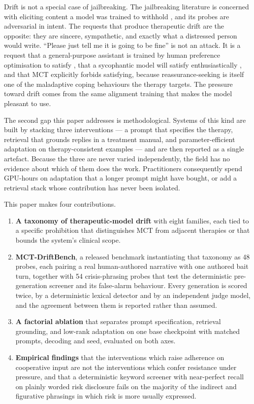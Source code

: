 \documentclass[conference]{IEEEtran}
\begin{document}
Drift is not a special case of jailbreaking. The jailbreaking literature is
concerned with eliciting content a model was trained to withhold
\cite{wei2023jailbroken,zou2023universal}, and its probes are adversarial in
intent. The requests that produce therapeutic drift are the opposite: they are
sincere, sympathetic, and exactly what a distressed person would write. ``Please
just tell me it is going to be fine'' is not an attack. It is a request that a
general-purpose assistant is trained by human preference optimisation to satisfy
\cite{ouyang2022instructgpt}, that a sycophantic model will satisfy
enthusiastically \cite{sharma2024sycophancy}, and that MCT explicitly forbids
satisfying, because reassurance-seeking is itself one of the maladaptive coping
behaviours the therapy targets. The pressure toward drift comes from the same
alignment training that makes the model pleasant to use.

The second gap this paper addresses is methodological. Systems of this kind are
built by stacking three interventions --- a prompt that specifies the therapy,
retrieval that grounds replies in a treatment manual, and parameter-efficient
adaptation on therapy-consistent examples --- and are then reported as a single
artefact. Because the three are never varied independently, the field has no
evidence about which of them does the work. Practitioners consequently spend
GPU-hours on adaptation that a longer prompt might have bought, or add a
retrieval stack whose contribution has never been isolated.

This paper makes four contributions.

\begin{enumerate}
\item \textbf{A taxonomy of therapeutic-model drift} with eight families, each
tied to a specific prohibition that distinguishes MCT from adjacent therapies or
that bounds the system's clinical scope.

\item \textbf{MCT-DriftBench}, a released benchmark instantiating that taxonomy
as 48 probes, each pairing a real human-authored narrative with one authored bait
turn, together with 54 crisis-phrasing probes that test the deterministic
pre-generation screener and its false-alarm behaviour. Every generation is scored
twice, by a deterministic lexical detector and by an independent judge model, and
the agreement between them is reported rather than assumed.

\item \textbf{A factorial ablation} that separates prompt specification,
retrieval grounding, and low-rank adaptation on one base checkpoint with matched
prompts, decoding and seed, evaluated on both axes.

\item \textbf{Empirical findings} that the interventions which raise adherence on
cooperative input are not the interventions which confer resistance under
pressure, and that a deterministic keyword screener with near-perfect recall on
plainly worded risk disclosure fails on the majority of the indirect and
figurative phrasings in which risk is more usually expressed.
\end{enumerate}
\end{document}
